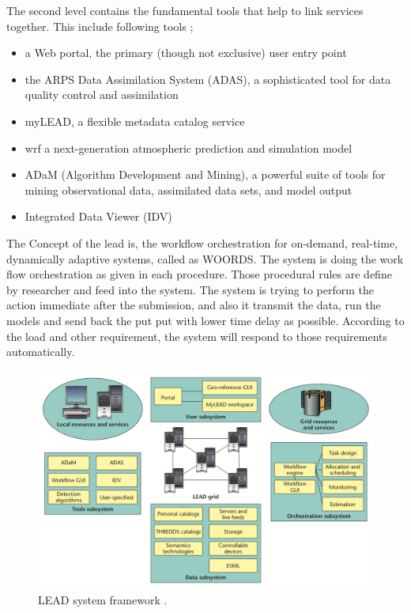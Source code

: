 The second level contains the fundamental tools that help to link services together. This include following tools \cite{Droegemeier2005Service-OrientedWeather};
\begin{itemize}
    \item a Web portal, the primary (though not exclusive) user entry point
    \item the ARPS Data Assimilation System (ADAS), a sophisticated tool for data quality control and assimilation
    \item myLEAD, a flexible metadata catalog service
    \item \acrfull{wrf} a next-generation atmospheric prediction and simulation model
    \item ADaM (Algorithm Development and Mining), a powerful suite of tools for mining observational data, assimilated data sets, and model output 
    \item Integrated Data Viewer (IDV) 
\end{itemize}

The Concept of the \acrshort{lead} is, the workflow orchestration for on-demand, real-time, dynamically adaptive systems, called as WOORDS. The system is doing the work flow orchestration as given in each procedure. Those procedural rules are define by researcher and feed into the system. The system is trying to perform the action immediate after the submission, and also it transmit the data, run the models and send back the put put with lower time delay as possible. According to the load and other requirement, the system will respond to those requirements automatically.

\begin{figure}[htp]
    \centering
    \includegraphics[width=1.0\textwidth]{lit/lead/LEAD-system-framework-LEAD-is-composed-of-several-interacting-subsystems-with-the-LEAD_W640.png}
    \caption[LEAD system framework]{LEAD system framework \cite{Droegemeier2005Service-OrientedWeather}.}
    \label{fi:lead_framework}
\end{figure}

